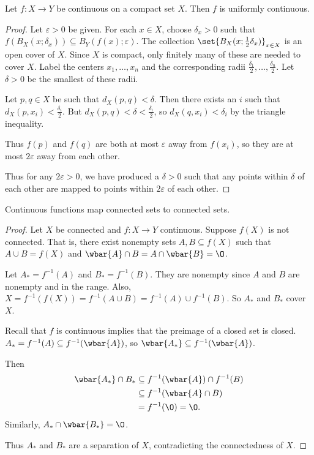 \begin{theorem} \label{thm:cont:compact_uniform}
    Let $f\colon X \to Y$ be continuous on a compact set $X$.
    Then $f$ is uniformly continuous.
\end{theorem}
\begin{proof}
    Let $\varepsilon > 0$ be given.
    For each $x \in X$, choose $\delta_x > 0$ such that
    $f(B_X(x; \delta_x)) \subseteq B_Y(f(x); \varepsilon)$.
    The collection $\set{B_X(x; \frac12 \delta_x)}_{x \in X}$ is an open
    cover of $X$.
    Since $X$ is compact, only finitely many of these are needed to cover
    $X$.
    Label the centers $x_1, \dots, x_n$ and the corresponding radii
    $\frac{\delta_1}{2}, \dots, \frac{\delta_n}{2}$.
    Let $\delta > 0$ be the smallest of these radii.

    Let $p, q \in X$ be such that $d_X(p, q) < \delta$.
    Then there exists an $i$ such that $d_X(p, x_i) < \frac{\delta_i}{2}$.
    But $d_X(p, q) < \delta < \frac{\delta_i}{2}$,
    so $d_X(q, x_i) < \delta_i$ by the triangle inequality.

    Thus $f(p)$ and $f(q)$ are both at most $\varepsilon$ away from
    $f(x_i)$, so they are at most $2\varepsilon$ away from each other.

    Thus for any $2\varepsilon > 0$, we have produced a $\delta > 0$ such
    that any points within $\delta$ of each other are mapped to points
    within $2\varepsilon$ of each other.
\end{proof}

\begin{theorem} \label{thm:cont:connected}
    Continuous functions map connected sets to connected sets.
\end{theorem}
\begin{proof}
    Let $X$ be connected and $f\colon X \to Y$ continuous.
    Suppose $f(X)$ is not connected.
    That is, there exist nonempty sets $A, B \subseteq f(X)$ such that
    $A \cup B = f(X)$ and $\wbar{A} \cap B = A \cap \wbar{B} = \O$.

    Let $A_* = f^{-1}(A)$ and $B_* = f^{-1}(B)$.
    They are nonempty since $A$ and $B$ are nonempty and in the range.
    Also,
    $X = f^{-1}(f(X)) = f^{-1}(A \cup B) = f^{-1}(A) \cup f^{-1}(B)$.
    So $A_*$ and $B_*$ cover $X$.

    Recall that $f$ is continuous implies that the preimage of a closed
    set is closed.
    $A_* = f^{-1}(A) \subseteq f^{-1}(\wbar{A})$, so
    $\wbar{A_*} \subseteq f^{-1}(\wbar{A})$.

    Then \begin{align*}
        \wbar{A_*} \cap B_* &\subseteq f^{-1}(\wbar{A}) \cap f^{-1}(B) \\
        &\subseteq f^{-1}(\wbar{A} \cap B) \\
        &= f^{-1}(\O) = \O.
    \end{align*}
    Similarly, $A_* \cap \wbar{B_*} = \O$.

    Thus $A_*$ and $B_*$ are a separation of $X$, contradicting the
    connectedness of $X$.
\end{proof}

